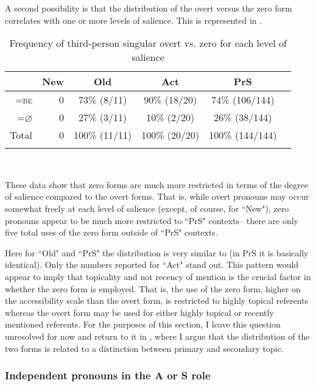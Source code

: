 A second possibility is that the distribution of the overt versus the zero form correlates with one or more levels of salience. This is represented in .
\begin{table}

\caption{{Frequency of third-person singular overt vs. zero for each level of salience}}
\begin{tabular}{ r   r  c  c  c  c }
\lsptoprule
 & New & Old & Act & PrS \\

\midrule
\textsc{=be} & 0 & 73{\%} (8/11) & 90{\%} (18/20) & 74{\%} (106/144) \\

\textsc{=$\varnothing$} & 0 & 27{\%} (3/11) & 10{\%} (2/20) & 26{\%} (38/144) \\

\midrule
Total& 0 & 100{\%} (11/11) & 100{\%} (20/20) & 100{\%} (144/144)  \\

\lspbottomrule
\end{tabular}\\
\label{overtvszerovsgiven}

\end{table}
These data show that zero forms are much more restricted in terms of the degree of salience compared to the overt forms. That is, while overt pronouns may occur somewhat freely at each level of salience (except, of course, for ``New"), zero pronouns appear to be much more restricted to ``PrS" contexts-- there are only five total uses of the zero form outside of ``PrS" contexts.

Here for ``Old" and ``PrS" the distribution is very similar to  (in PrS it is basically identical). Only the numbers reported for ``Act" stand out. This pattern would appear to imply that topicality and not recency of mention is the crucial factor in whether the zero form is employed. That is, the use of the zero form, higher on the accessibility scale than the overt form, is restricted to highly topical referents whereas the overt form may be used for either highly topical or recently mentioned referents. For the purposes of this section, I leave this question unresolved for now and return to it in , where I argue that the distribution of the two forms is related to a distinction between primary and secondary topic. 
 

\subsubsection{Independent pronouns in the A or S role}\label{markedtopics}

